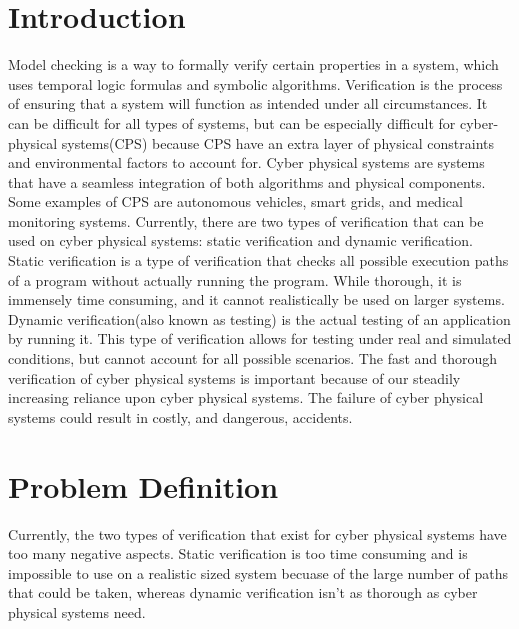 \documentclass[peerreview]{IEEEtran}
\begin{document}
\section{Introduction}
Model checking is a way to formally verify certain properties in a system, which uses temporal logic formulas and symbolic algorithms. Verification is the process of ensuring that a system will function as intended under all circumstances. It can be difficult for all types of systems, but can be especially difficult for cyber-physical systems(CPS) because CPS have an extra layer of physical constraints and environmental factors to account for. Cyber physical systems are systems that have a seamless integration of both algorithms and physical components. Some examples of CPS are autonomous vehicles, smart grids, and medical monitoring systems. Currently, there are two types of verification that can be used on cyber physical systems: static verification and dynamic verification. Static verification is a type of verification that checks all possible execution paths of a program without actually running the program. While thorough, it is immensely time consuming, and it cannot realistically be used on larger systems. Dynamic verification(also known as testing) is the actual testing of an application by running it.  This type of verification allows for testing under real and simulated conditions, but cannot account for all possible scenarios. The fast and thorough verification of cyber physical systems is important because of our steadily increasing reliance upon cyber physical systems. The failure of cyber physical systems could result in costly, and dangerous, accidents. 

\section{Problem Definition}
Currently, the two types of verification that exist for cyber physical systems have too many negative aspects. Static verification is too time consuming and is impossible to use on a realistic sized system becuase of the large number of paths that could be taken, whereas dynamic verification isn't as thorough as cyber physical systems need. 


%
% 
\end{document}
